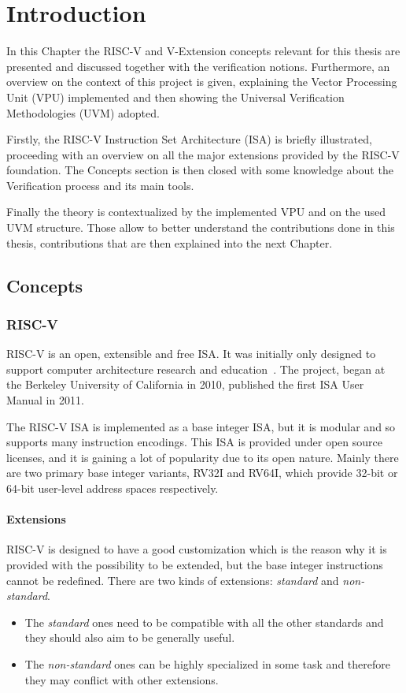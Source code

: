 \chapter{Introduction}
In this Chapter the RISC-V and V-Extension concepts relevant for this thesis are presented and discussed together with  the verification notions.
Furthermore, an overview on the context of this project is given,  explaining the Vector Processing Unit (VPU) implemented and then showing the Universal Verification Methodologies (UVM) adopted.

Firstly, the RISC-V Instruction Set Architecture (ISA) is briefly illustrated, proceeding with an overview on all the major extensions provided by the \mbox{RISC-V} foundation. The Concepts section is then closed with some knowledge about the Verification process and its main tools. 

Finally the theory is contextualized by the implemented VPU and on the used UVM structure. Those allow to better understand the contributions done in this thesis, contributions that are then explained into the next Chapter.






\section{Concepts}
\subsection{RISC-V}
RISC-V is an open, extensible and free ISA. It was initially only designed to support computer architecture research and education~\cite{RISC-V-Instruction-Set-Manual}.
The project, began at the Berkeley University of California in 2010, published the first ISA User Manual in 2011. 

The RISC-V ISA is implemented as a base integer ISA, but it is modular and so supports many instruction encodings.
This ISA is provided under open source licenses, and it is gaining a lot of popularity due to its open nature. 
Mainly there are two primary base integer variants, RV32I and RV64I, which provide 32-bit or 64-bit user-level address spaces respectively.

\subsubsection{Extensions}

RISC-V is designed to have a good customization which is the reason why it is provided with the possibility to be extended, but the base integer instructions cannot be redeﬁned.
There are two kinds of extensions:
\textit{standard} and \textit{non-standard}.
\begin{itemize}
    \item The \textit{standard} ones need to be compatible with all the other standards and they should also aim to be generally useful.
    \item The \textit{non-standard} ones can be highly specialized in some task and therefore they may conflict with other extensions.
\end{itemize}

